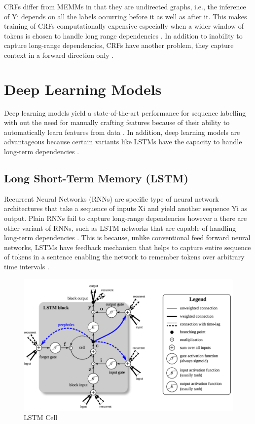 CRFs differ from MEMMs in that they are undirected graphs, i.e., the inference of Yi depends on all the labels occurring before it as well as after it. This makes training of CRFs computationally expensive especially when a wider window of tokens is chosen to handle long range dependencies \citep{aggarwal2018machine}. In addition to inability to capture long-range dependencies, CRFs have another problem, they capture context in a forward direction only \citep{lample2016neural}.



\section{Deep Learning Models }
\label{sec:chapter05:MLModels:DLMs}

Deep learning models yield a state-of-the-art performance for sequence labelling with out the need for manually crafting features because of their ability to automatically learn features from data \citep{he2020survey}. In addition, deep learning models are advantageous because certain variants like LSTMs have the capacity to handle long-term dependencies \citep{akhundov2018sequence}. 



\subsection{Long Short-Term Memory (LSTM)}
\label{sec:chapter05:DLModels:LSTM}

Recurrent Neural Networks (RNNs) are specific type of neural network architectures that take a sequence of inputs Xi and yield another sequence Yi as output. Plain RNNs fail to capture long-range dependencies however a there are other variant of RNNs, such as LSTM networks that are capable of handling long-term dependencies \citep{akhundov2018sequence, lample2016neural}. This is because, unlike conventional feed forward neural networks, LSTMs have feedback mechanism that helps to capture entire sequence of tokens in a sentence enabling the network to remember tokens over arbitrary time intervals \citep{enwiki:1073570927}. 

\begin{figure}[htbp]
	\centering
	\includegraphics[width=.65\textwidth]{4.graphics/figures/models/pdf/LSTM_cell}
	\caption{LSTM Cell \citep{ma2016end}}
	\label{fig:chapter03:setup}
\end{figure}

